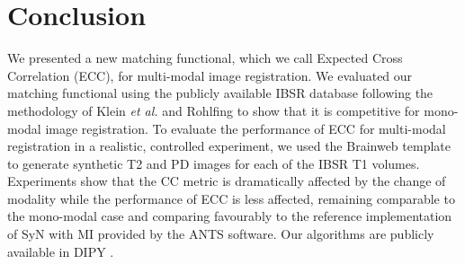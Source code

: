 \section{Conclusion}
We presented a new matching functional, which we call Expected Cross Correlation (ECC), for multi-modal image registration. We evaluated our matching functional using the publicly available IBSR database following the methodology of Klein {\it et al.} \cite{Klein2009, Klein2010} and Rohlfing \cite{Rohlfing2012} to show that it is competitive for mono-modal image registration. To evaluate the performance of ECC for multi-modal registration in a realistic, controlled experiment, we used the Brainweb \cite{Cocosco1997, Kwan1999} template to generate synthetic T2 and PD images for each of the IBSR T1 volumes. Experiments show that the CC metric is dramatically affected by the change of modality while the performance of ECC is less affected, remaining comparable to the mono-modal case and comparing favourably to the reference implementation of SyN with MI provided by the ANTS software. Our algorithms are publicly available in DIPY \cite{Garyfallidis2014}.


